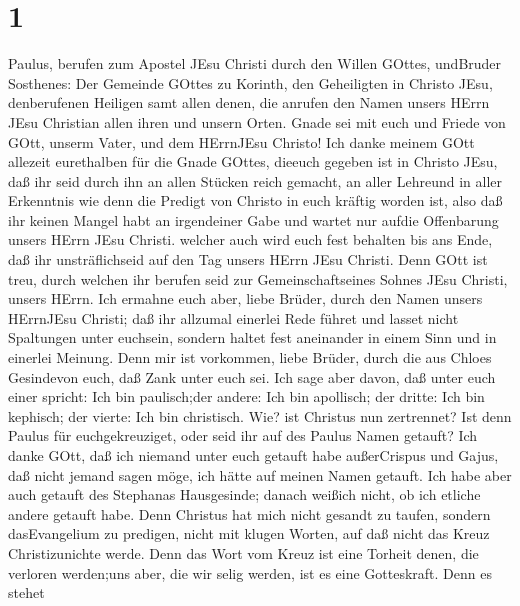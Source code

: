\hypertarget{section}{%
\section{1}\label{section}}

 Paulus, berufen zum Apostel JEsu Christi durch den Willen
GOttes, undBruder Sosthenes:  Der Gemeinde GOttes zu
Korinth, den Geheiligten in Christo JEsu, denberufenen Heiligen samt
allen denen, die anrufen den Namen unsers HErrn JEsu Christian allen
ihren und unsern Orten.  Gnade sei mit euch und Friede von
GOtt, unserm Vater, und dem HErrnJEsu Christo!  Ich danke
meinem GOtt allezeit eurethalben für die Gnade GOttes, dieeuch gegeben
ist in Christo JEsu,  daß ihr seid durch ihn an allen
Stücken reich gemacht, an aller Lehreund in aller Erkenntnis
 wie denn die Predigt von Christo in euch kräftig worden
ist,  also daß ihr keinen Mangel habt an irgendeiner Gabe
und wartet nur aufdie Offenbarung unsers HErrn JEsu Christi.
 welcher auch wird euch fest behalten bis ans Ende, daß ihr
unsträflichseid auf den Tag unsers HErrn JEsu Christi.  Denn
GOtt ist treu, durch welchen ihr berufen seid zur Gemeinschaftseines
Sohnes JEsu Christi, unsers HErrn.  Ich ermahne euch aber,
liebe Brüder, durch den Namen unsers HErrnJEsu Christi; daß ihr allzumal
einerlei Rede führet und lasset nicht Spaltungen unter euchsein, sondern
haltet fest aneinander in einem Sinn und in einerlei Meinung.
 Denn mir ist vorkommen, liebe Brüder, durch die aus Chloes
Gesindevon euch, daß Zank unter euch sei.  Ich sage aber
davon, daß unter euch einer spricht: Ich bin paulisch;der andere: Ich
bin apollisch; der dritte: Ich bin kephisch; der vierte: Ich bin
christisch.  Wie? ist Christus nun zertrennet? Ist denn
Paulus für euchgekreuziget, oder seid ihr auf des Paulus Namen getauft?
 Ich danke GOtt, daß ich niemand unter euch getauft habe
außerCrispus und Gajus,  daß nicht jemand sagen möge, ich
hätte auf meinen Namen getauft.  Ich habe aber auch getauft
des Stephanas Hausgesinde; danach weißich nicht, ob ich etliche andere
getauft habe.  Denn Christus hat mich nicht gesandt zu
taufen, sondern dasEvangelium zu predigen, nicht mit klugen Worten, auf
daß nicht das Kreuz Christizunichte werde.  Denn das Wort
vom Kreuz ist eine Torheit denen, die verloren werden;uns aber, die wir
selig werden, ist es eine Gotteskraft.  Denn es stehet
